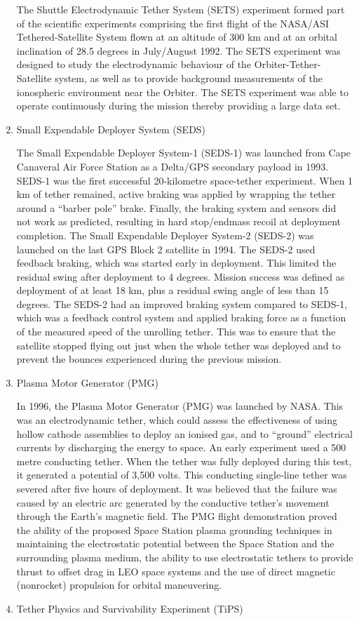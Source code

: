 \begin{enumerate}
	The Shuttle Electrodynamic Tether System (SETS) experiment formed part of the scientific experiments comprising the first flight of the NASA/ASI Tethered-Satellite System flown at an altitude of 300 km and at an orbital inclination of 28.5 degrees in July/August 1992. The SETS experiment was designed to study the electrodynamic behaviour of the Orbiter-Tether-Satellite system, as well as to provide background measurements of the ionospheric environment near the Orbiter. The SETS experiment was able to operate continuously during the mission thereby providing a large data set.
\item{Small Expendable Deployer System (SEDS)}

The Small Expendable Deployer System-1 (SEDS-1) was launched from Cape Canaveral Air Force Station as a Delta/GPS secondary payload in 1993. SEDS-1 was the first successful 20-kilometre space-tether experiment. When 1 km of tether remained, active braking was applied by wrapping the tether around a “barber pole” brake. Finally, the braking system and sensors did not work as predicted, resulting in hard stop/endmass recoil at deployment completion.
The Small Expendable Deployer System-2 (SEDS-2) was launched on the last GPS Block 2 satellite in 1994. The SEDS-2 used feedback braking, which was started early in deployment. This limited the residual swing after deployment to 4 degrees. Mission success was defined as deployment of at least 18 km, plus a residual swing angle of less than 15 degrees. The SEDS-2 had an improved braking system compared to SEDS-1, which was a feedback control system and applied braking force as a function of the measured speed of the unrolling tether. This was to ensure that the satellite stopped flying out just when the whole tether was deployed and to prevent the bounces experienced during the previous mission.
\item{Plasma Motor Generator (PMG)}

In 1996, the Plasma Motor Generator (PMG) was launched by NASA. This was an electrodynamic tether, which could assess the effectiveness of using hollow cathode assemblies to deploy an ionised gas, and to “ground” electrical currents by discharging the energy to space. An early experiment used a 500 metre conducting tether. When the tether was fully deployed during this test, it generated a potential of 3,500 volts. This conducting single-line tether was severed after five hours of deployment. It was believed that the failure was caused by an electric arc generated by the conductive tether’s movement through the Earth’s magnetic field. The PMG flight demonstration proved the ability of the proposed Space Station plasma grounding techniques in maintaining the electrostatic potential between the Space Station and the surrounding plasma medium, the ability to use electrostatic tethers to provide thrust to offset drag in LEO space systems and the use of direct magnetic (nonrocket) propulsion for orbital maneuvering.
\item{Tether Physics and Survivability Experiment (TiPS)}


\end{enumerate}

